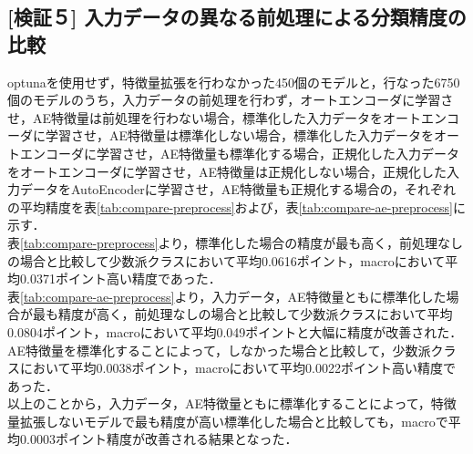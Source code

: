 \subsection{[検証５] 入力データの異なる前処理による分類精度の比較}
optunaを使用せず，特徴量拡張を行わなかった450個のモデルと，行なった6750個のモデルのうち，入力データの前処理を行わず，オートエンコーダに学習させ，AE特徴量は前処理を行わない場合，標準化した入力データをオートエンコーダに学習させ，AE特徴量は標準化しない場合，標準化した入力データをオートエンコーダに学習させ，AE特徴量も標準化する場合，正規化した入力データをオートエンコーダに学習させ，AE特徴量は正規化しない場合，正規化した入力データをAutoEncoderに学習させ，AE特徴量も正規化する場合の，それぞれの平均精度を表\ref{tab:compare-preprocess}および，表\ref{tab:compare-ae-preprocess}に示す．\\
表\ref{tab:compare-preprocess}より，標準化した場合の精度が最も高く，前処理なしの場合と比較して少数派クラスにおいて平均0.0616ポイント，macroにおいて平均0.0371ポイント高い精度であった．\\
表\ref{tab:compare-ae-preprocess}より，入力データ，AE特徴量ともに標準化した場合が最も精度が高く，前処理なしの場合と比較して少数派クラスにおいて平均0.0804ポイント，macroにおいて平均0.049ポイントと大幅に精度が改善された．\\
AE特徴量を標準化することによって，しなかった場合と比較して，少数派クラスにおいて平均0.0038ポイント，macroにおいて平均0.0022ポイント高い精度であった．\\
以上のことから，入力データ，AE特徴量ともに標準化することによって，特徴量拡張しないモデルで最も精度が高い標準化した場合と比較しても，macroで平均0.0003ポイント精度が改善される結果となった．\\


